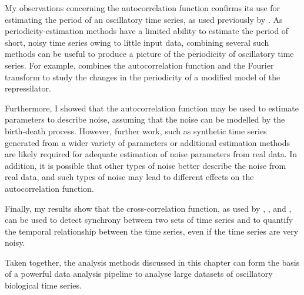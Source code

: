My observations concerning the autocorrelation function confirms its use for estimating the period of an oscillatory time series, as used previously by \textcite{papagiannakisAutonomousMetabolicOscillations2017}.
As periodicity-estimation methods have a limited ability to estimate the period of short, noisy time series owing to little input data, combining several such methods can be useful to produce a picture of the periodicity of oscillatory time series.
For example, \textcite{potvin-trottierSynchronousLongtermOscillations2016} combines the autocorrelation function and the Fourier transform to study the changes in the periodicity of a modified model of the repressilator.

Furthermore, I showed that the autocorrelation function may be used to estimate parameters to describe noise, assuming that the noise can be modelled by the birth-death process.
However, further work, such as synthetic time series generated from a wider variety of parameters or additional estimation methods are likely required for adequate estimation of noise parameters from real data.
In addition, it is possible that other types of noise better describe the noise from real data, and such types of noise may lead to different effects on the autocorrelation function.

Finally, my results show that the cross-correlation function, as used by \textcite{dunlopRegulatoryActivityRevealed2008}, \textcite{kivietStochasticityMetabolismGrowth2014}, and \textcite{pietschDeterminingGrowthRates2023}, can be used to detect synchrony between two sets of time series and to quantify the temporal relationship between the time series, even if the time series are very noisy.

Taken together, the analysis methods discussed in this chapter can form the basis of a powerful data analysis pipeline to analyse large datasets of oscillatory biological time series.
